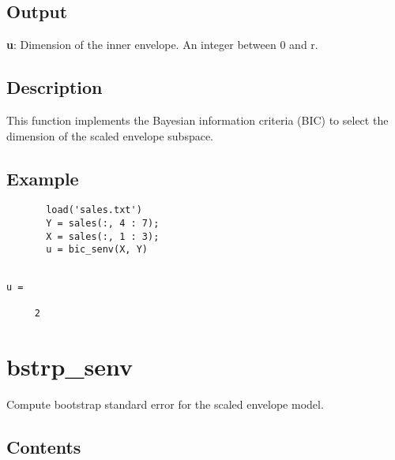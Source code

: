 \documentclass[a4paper,11pt,openany]{memoir}
\begin{document}
\subsection*{Output}

\begin{par}
\textbf{u}: Dimension of the inner envelope. An integer between 0 and r.
\end{par} \vspace{1em}


\subsection*{Description}

\begin{par}
This function implements the Bayesian information criteria (BIC) to select the dimension of the scaled envelope subspace.
\end{par} \vspace{1em}


\subsection*{Example}


\begin{verbatim}       load('sales.txt')
       Y = sales(:, 4 : 7);
       X = sales(:, 1 : 3);
       u = bic_senv(X, Y)\end{verbatim}
    
        \color{lightgray}\ttfamily \begin{verbatim}

u =

     2

\end{verbatim} \rmfamily
\color{black}
\newpage

\rmfamily
\color{black}\section{bstrp\_senv}

\begin{par}
Compute bootstrap standard error for the scaled envelope model.
\end{par} \vspace{1em}

\subsection*{Contents}
\end{document}

